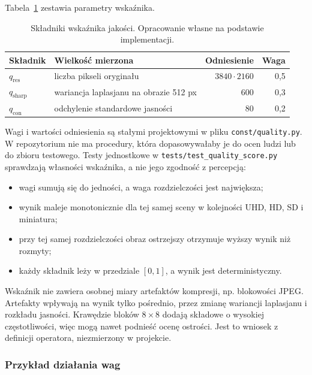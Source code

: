 Tabela~\ref{tab:quality-factors} zestawia parametry wskaźnika.

\begin{table}[!htbp]
\centering
\caption{Składniki wskaźnika jakości.
Opracowanie własne na podstawie implementacji.}
\label{tab:quality-factors}
\begin{tabular}{|l|p{}|r|r|}
\hline
\textbf{Składnik} & \textbf{Wielkość mierzona} &
\textbf{Odniesienie} & \textbf{Waga} \\
\hline
\(q_{\mathrm{res}}\) & liczba pikseli oryginału &
\(3840\cdot2160\) & 0,5 \\
\hline
\(q_{\mathrm{sharp}}\) & wariancja laplasjanu na obrazie 512 px &
600 & 0,3 \\
\hline
\(q_{\mathrm{con}}\) & odchylenie standardowe jasności &
80 & 0,2 \\
\hline
\end{tabular}
\end{table}

Wagi i wartości odniesienia są stałymi projektowymi w pliku
\texttt{const/quality.py}. W repozytorium nie ma procedury, która
dopasowywałaby je do ocen ludzi lub do zbioru testowego. Testy
jednostkowe w \texttt{tests/test\_quality\_score.py} sprawdzają
własności wskaźnika, a nie jego zgodność z percepcją:

\begin{itemize}
    \item wagi sumują się do jedności, a waga rozdzielczości jest
    największa;
    \item wynik maleje monotonicznie dla tej samej sceny w kolejności
    UHD, HD, SD i miniatura;
    \item przy tej samej rozdzielczości obraz ostrzejszy otrzymuje
    wyższy wynik niż rozmyty;
    \item każdy składnik leży w przedziale \([0,1]\), a wynik jest
    deterministyczny.
\end{itemize}

Wskaźnik nie zawiera osobnej miary artefaktów kompresji, np.
blokowości JPEG. Artefakty wpływają na wynik tylko pośrednio, przez
zmianę wariancji laplasjanu i rozkładu jasności. Krawędzie bloków
\(8\times8\) dodają składowe o wysokiej częstotliwości, więc mogą
nawet podnieść ocenę ostrości. Jest to wniosek z definicji
operatora, niezmierzony w projekcie.

\subsubsection{Przykład działania wag}

